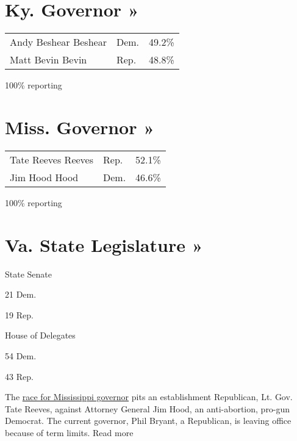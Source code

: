 \href{https://www.nytimes3xbfgragh.onion/interactive/2019/11/05/us/elections/results-kentucky-governor-general-election.html}{}

\hypertarget{ky-governor-}{%
\section{Ky. Governor »}\label{ky-governor-}}

\begin{longtable}[]{@{}lll@{}}
\toprule
\endhead
 Andy Beshear Beshear & Dem. & 49.2\%\tabularnewline
 Matt Bevin Bevin & Rep. & 48.8\%\tabularnewline
\bottomrule
\end{longtable}

100\% reporting

\href{https://www.nytimes3xbfgragh.onion/interactive/2019/11/05/us/elections/results-mississippi-governor-general-election.html}{}

\hypertarget{miss-governor-}{%
\section{Miss. Governor »}\label{miss-governor-}}

\begin{longtable}[]{@{}lll@{}}
\toprule
\endhead
 Tate Reeves Reeves & Rep. & 52.1\%\tabularnewline
 Jim Hood Hood & Dem. & 46.6\%\tabularnewline
\bottomrule
\end{longtable}

100\% reporting

\href{https://www.nytimes3xbfgragh.onion/interactive/2019/11/05/us/elections/results-virginia-general-elections.html}{}

\hypertarget{va-state-legislature-}{%
\section{Va. State Legislature »}\label{va-state-legislature-}}

State Senate

21 Dem.

19 Rep.

House of Delegates

54 Dem.

43 Rep.

The
\href{https://www.nytimes3xbfgragh.onion/2019/11/05/us/politics/election-day-2019.html}{race
for Mississippi governor} pits an establishment Republican, Lt. Gov.
Tate Reeves, against Attorney General Jim Hood, an anti-abortion,
pro-gun Democrat. The current governor, Phil Bryant, a Republican, is
leaving office because of term limits. Read more

